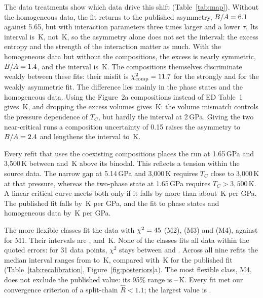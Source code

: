 The data treatments show which data drive this shift (Table~\ref{tab:map}). Without the
homogeneous data, the fit returns to the published asymmetry, $B/A = 6.1{}$
against 5.65, but with interaction parameters three times larger and a lower $\tau$. Its
interval is \IntMOnePhaseComp{}\,K, not \pubIntTwo{}\,K, so the asymmetry alone does not set the
interval: the excess entropy and the strength of the interaction matter as much. With the
homogeneous data but without the compositions, the excess is nearly symmetric,
$B/A = 1.4{}$, and the interval is \IntMOnePhaseHom{}\,K. The compositions themselves
discriminate weakly between these fits: their misfit is $\chi^2_{\rm comp} =
11.7{}$ for the strongly and \ChiCompMOneTable{} for the weakly asymmetric
fit. The difference lies mainly in the phase states and the
homogeneous data. Using the Figure~2a compositions instead of ED Table~1 gives
\IntMOneFigure{}\,K, and dropping the excess volumes gives \IntMOneNoVolume{}\,K: the volume
mismatch controls the pressure dependence of $T_C$, but hardly the interval at 2\,GPa. Giving
the two near-critical runs a composition uncertainty of 0.15 raises the asymmetry to
$B/A = 2.4{}$ and lengthens the interval to \IntMOneInflated{}\,K.

Every refit that uses the coexisting compositions places the run at 1.65\,GPa and 3,500\,K
between \missLo{} and \missHi{}\,K above its binodal. This reflects a tension within the source
data. The narrow gap at 5.14\,GPa and 3,000\,K requires $T_C$ close to 3,000\,K at that pressure,
whereas the two-phase state at 1.65\,GPa requires $T_C > 3{,}500$\,K. A linear critical curve
meets both only if it falls by more than about \slopeMinimum{}\,K per GPa. The published fit falls
by \slopePublished{}\,K per GPa, and the fit to phase states and homogeneous data by
\SlopeMOnePhaseHom{}\,K per GPa.

The more flexible classes fit the data with $\chi^2 = 45{}$ (M2), \ChiMThree{} (M3) and
\ChiMFour{} (M4), against \ChiMOneTable{} for M1. Their intervals are \IntMTwo{},
\IntMThree{} and \IntMFour{}\,K. None of the classes fits all data within the quoted errors: for 31 data
points, $\chi^2$ stays between \ChiMTwo{} and \ChiMOneTable{}. Across all nine refits the median
interval ranges from \IntRangeLo{} to \IntRangeHi{}\,K, compared with \pubIntTwo{}\,K for the
published fit (Table~\ref{tab:recalibration}, Figure~\ref{fig:posteriors}a). The most flexible class, M4, does not
exclude the published value: its 95\% range is \IntMFourLoNinetyFive{}--\IntMFourHiNinetyFive{}\,K. Every fit met our convergence criterion of a
split-chain $\hat R < 1.1$; the largest value is \maxRhat{}.

